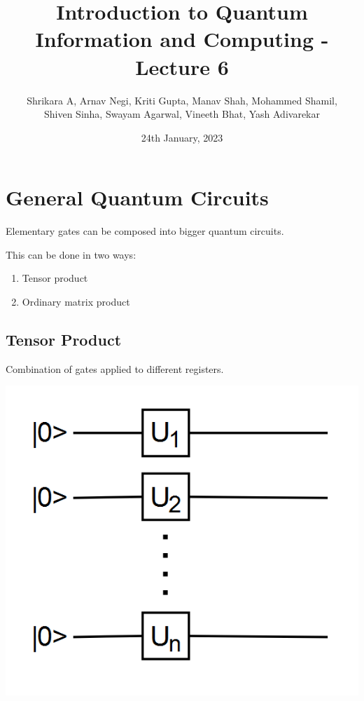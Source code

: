 \documentclass{article}
\title{Introduction to Quantum Information and Computing - Lecture 6}
\author{Shrikara A, Arnav Negi, Kriti Gupta, Manav Shah, Mohammed Shamil,\\ Shiven Sinha, Swayam Agarwal, Vineeth Bhat, Yash Adivarekar} %
\date{24th January, 2023}
\begin{document}
    \maketitle
    \vfill
    \tableofcontents
    \newpage

            

        


\section{General Quantum Circuits}
Elementary gates can be composed into bigger quantum circuits.

This can be done in two ways:
\begin{enumerate}
    \item Tensor product
    \item Ordinary matrix product
\end{enumerate}

\subsection{Tensor Product}
Combination of gates applied to different registers.

\includegraphics[scale=0.5]{q1.png}
\end{document}
